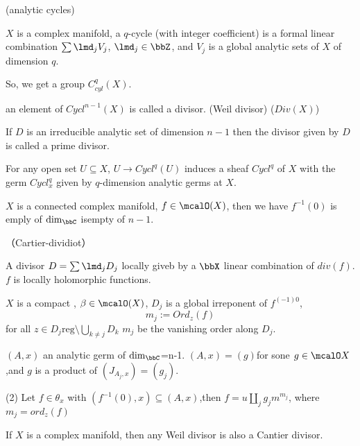 \begin{definition}(analytic cycles)

$X$ is a complex manifold,  a $q$-cycle (with integer coefficient)
is a formal linear combination $\sum\limits\lmd_j V_j$, $\lmd_j\in\bbZ$,
and $V_j$ is a global analytic sets of $X$ of dimension $q$.
\end{definition}

So, we get a group $C_{cyl}^q(X)$.

an element of $Cycl^{n-1}(X)$ is called a divisor.
(Weil divisor)
($Div(X)$)

If $D$ is an irreducible analytic set of dimension $n-1$
then the divisor given by $D$ is called a prime divisor.

\begin{rem}
For any open set $U\subseteq X$, $U\to Cycl^q(U)$ induces a sheaf
$Cycl^q$ of $X$ with the germ $Cycl_x^q$ given by $q$-dimension analytic germs at $X$.
\end{rem}

\begin{thm}
$X$ is a connected complex manifold, $f\in\mcalO(X)$,
then we have $f^{-1}(0)$ is emply of $\dim_{\bbC}$ isempty of $n-1$.
\end{thm}


\begin{definition}（Cartier-dividiot）

A divisor $D=\sum\lmd_j D_j$ locally giveb by a $\bbX$ linear combination of $div(f)$.
$f$ is locally holomorphic functions.
\end{definition}

\begin{definition}
$X$ is a compact , $\beta\in\mcalO(X)$,
$D_j$ is a global irreponent of $f^{(-1)0}$,
$$m_j:=Ord_z(f)$$
for all $z\in D_j{\text{reg}}\setminus \bigcup_{k\neq j} D_k $
$m_j$ be the vanishing order along $D_j$.
\end{definition}

\begin{thm}
$(A,x)$ an analytic germ of $\dim_{\bbC}$=n-1.
$(A,x)=(g)$for sone $g\in \mcalO X$,and $g$ is a product of
$(J_{A_j,x})=(g_j)$.

(2) Let $f\in\theta_x$ with $(f^{-1}(0),x)\subseteq(A,x)$,then
$f=u\coprod_j g_jm^{m_j}$, where $m_j=ord_z (f)$
\end{thm}

\begin{prop}If $X$ is a complex manifold, then any Weil divisor is
also a Cantier divisor.
\end{prop}

